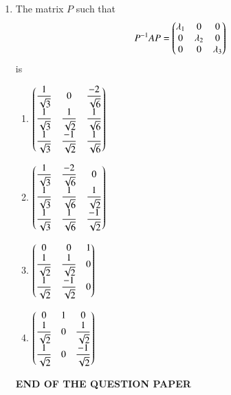 \documentclass[journal]{IEEEtran}
\numberwithin{equation}{enumi}
\numberwithin{figure}{enumi}
\begin{document}
\begin{enumerate}
\item The matrix $P$ such that   \hfill{}
\[
	P^{-1} A P = \begin{pmatrix}
\lambda_1 & 0 & 0 \\
0 & \lambda_2 & 0 \\
0 & 0 & \lambda_3
\end{pmatrix}
 \]
is 
\begin{multicols}{2}
    \begin{enumerate}
        \item  $\begin{pmatrix}
    \dfrac{1}{\sqrt{3}} & 0 & \dfrac{-2}{\sqrt{6}} \\
    \dfrac{1}{\sqrt{3}} & \dfrac{1}{\sqrt{2}} & \dfrac{1}{\sqrt{6}} \\
    \dfrac{1}{\sqrt{3}} & \dfrac{-1}{\sqrt{2}} & \dfrac{1}{\sqrt{6}}
    \end{pmatrix}$
        \item $\begin{pmatrix}
    \dfrac{1}{\sqrt{3}} & \dfrac{-2}{\sqrt{6}} & 0 \\
    \dfrac{1}{\sqrt{3}} & \dfrac{1}{\sqrt{6}} & \dfrac{1}{\sqrt{2}} \\
    \dfrac{1}{\sqrt{3}} & \dfrac{1}{\sqrt{6}} & \dfrac{-1}{\sqrt{2}}
    \end{pmatrix}$
        \item $\begin{pmatrix}
    0 & 0 & 1 \\
    \dfrac{1}{\sqrt{2}} & \dfrac{1}{\sqrt{2}} & 0 \\
    \dfrac{1}{\sqrt{2}} & \dfrac{-1}{\sqrt{2}} & 0
   \end{pmatrix}$
        \item $\begin{pmatrix}
    0 & 1 & 0 \\
    \dfrac{1}{\sqrt{2}} & 0 & \dfrac{1}{\sqrt{2}} \\
    \dfrac{1}{\sqrt{2}} & 0 & \dfrac{-1}{\sqrt{2}}
    \end{pmatrix}$
    \end{enumerate}
    \end{multicols}




\vspace{5em}
\begin{center}
    \textbf{END OF THE QUESTION PAPER}
\end{center}

\end{enumerate}
\end{document}

